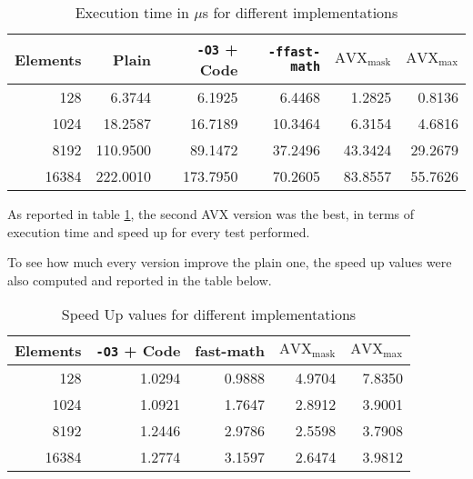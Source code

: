\documentclass[12pt, a4paper]{article}
\begin{document}
\begin{table}[H]
	\centering
	\begin{tabular}{r | rrrrr}
		\toprule
		Elements & Plain    & \verb|-O3| + Code & \verb|-ffast-math| & $\text{AVX}_\text{mask}$ & $\text{AVX}_\text{max}$ \\
		\midrule
		128      & 6.3744   & 6.1925            & 6.4468             & 1.2825                   & 0.8136                  \\
		1024     & 18.2587  & 16.7189           & 10.3464            & 6.3154                   & 4.6816                  \\
		8192     & 110.9500 & 89.1472           & 37.2496            & 43.3424                  & 29.2679                 \\
		16384    & 222.0010 & 173.7950          & 70.2605            & 83.8557                  & 55.7626                 \\
		\bottomrule
	\end{tabular}
	\caption{Execution time in $\mu$s for different implementations}
	\label{tab: times}
\end{table}

As reported in table \ref{tab: times}, the second AVX version was the best, in
terms of execution time and speed up for every test performed.

To see how much every version improve the plain one, the speed up values were
also computed and reported in the table below.

\begin{table}[H]
	\centering
	\begin{tabular}{r|rrrr}
		\toprule
		Elements & \verb|-O3| + Code & fast-math & $\text{AVX}_\text{mask}$ & $\text{AVX}_\text{max}$ \\
		\midrule
		128      & 1.0294            & 0.9888    & 4.9704                   & 7.8350                  \\
		1024     & 1.0921            & 1.7647    & 2.8912                   & 3.9001                  \\
		8192     & 1.2446            & 2.9786    & 2.5598                   & 3.7908                  \\
		16384    & 1.2774            & 3.1597    & 2.6474                   & 3.9812                  \\
		\bottomrule
	\end{tabular}
	\caption{Speed Up values for different implementations}
	\label{tab: speedup}
\end{table}
\end{document}
